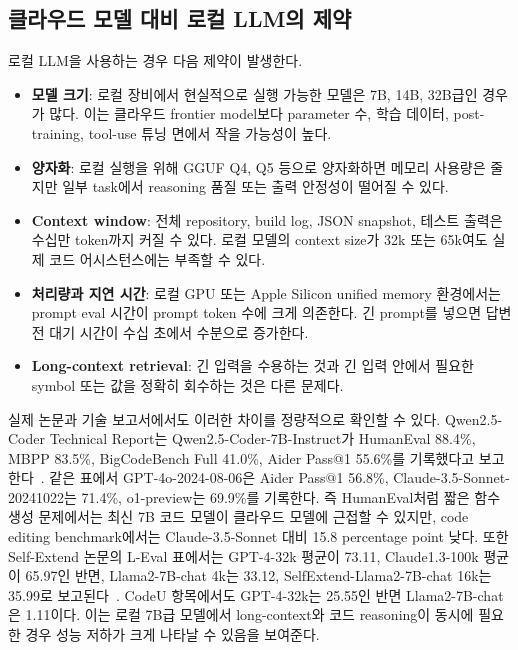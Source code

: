 \documentclass[11pt,a4paper]{article}
\begin{document}
\subsection{클라우드 모델 대비 로컬 LLM의 제약}

로컬 LLM을 사용하는 경우 다음 제약이 발생한다.

\begin{itemize}
  \item \textbf{모델 크기}: 로컬 장비에서 현실적으로 실행 가능한 모델은 7B, 14B, 32B급인 경우가 많다. 이는 클라우드 frontier model보다 parameter 수, 학습 데이터, post-training, tool-use 튜닝 면에서 작을 가능성이 높다.
  \item \textbf{양자화}: 로컬 실행을 위해 GGUF Q4, Q5 등으로 양자화하면 메모리 사용량은 줄지만 일부 task에서 reasoning 품질 또는 출력 안정성이 떨어질 수 있다.
  \item \textbf{Context window}: 전체 repository, build log, JSON snapshot, 테스트 출력은 수십만 token까지 커질 수 있다. 로컬 모델의 context size가 32k 또는 65k여도 실제 코드 어시스턴스에는 부족할 수 있다.
  \item \textbf{처리량과 지연 시간}: 로컬 GPU 또는 Apple Silicon unified memory 환경에서는 prompt eval 시간이 prompt token 수에 크게 의존한다. 긴 prompt를 넣으면 답변 전 대기 시간이 수십 초에서 수분으로 증가한다.
  \item \textbf{Long-context retrieval}: 긴 입력을 수용하는 것과 긴 입력 안에서 필요한 symbol 또는 값을 정확히 회수하는 것은 다른 문제다.
\end{itemize}

실제 논문과 기술 보고서에서도 이러한 차이를 정량적으로 확인할 수 있다. Qwen2.5-Coder Technical Report는 Qwen2.5-Coder-7B-Instruct가 HumanEval 88.4\%, MBPP 83.5\%, BigCodeBench Full 41.0\%, Aider Pass@1 55.6\%를 기록했다고 보고한다~\cite{hui2024qwen25coder}. 같은 표에서 GPT-4o-2024-08-06은 Aider Pass@1 56.8\%, Claude-3.5-Sonnet-20241022는 71.4\%, o1-preview는 69.9\%를 기록한다. 즉 HumanEval처럼 짧은 함수 생성 문제에서는 최신 7B 코드 모델이 클라우드 모델에 근접할 수 있지만, code editing benchmark에서는 Claude-3.5-Sonnet 대비 15.8 percentage point 낮다. 또한 Self-Extend 논문의 L-Eval 표에서는 GPT-4-32k 평균이 73.11, Claude1.3-100k 평균이 65.97인 반면, Llama2-7B-chat 4k는 33.12, SelfExtend-Llama2-7B-chat 16k는 35.99로 보고된다~\cite{jin2024selfextend}. CodeU 항목에서도 GPT-4-32k는 25.55인 반면 Llama2-7B-chat은 1.11이다. 이는 로컬 7B급 모델에서 long-context와 코드 reasoning이 동시에 필요한 경우 성능 저하가 크게 나타날 수 있음을 보여준다.
\end{document}
